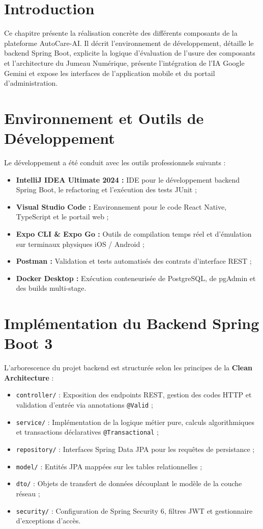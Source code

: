 \documentclass[12pt,a4paper,oneside]{report}
\newcommand{\bpuce}{\textcolor{midBlue}{$\blacktriangleright$}\;}
\newcommand{\subpuce}{\textcolor{steelBlue}{$\bullet$}\;}
\begin{document}
\section{Introduction}
Ce chapitre pr\'esente la r\'ealisation concr\`ete des diff\'erents composants de la plateforme AutoCare-AI. Il d\'ecrit l'environnement de d\'eveloppement, d\'etaille le backend Spring Boot, explicite la logique d'\'evaluation de l'usure des composants et l'architecture du Jumeau Num\'erique, pr\'esente l'int\'egration de l'IA Google Gemini et expose les interfaces de l'application mobile et du portail d'administration.

\section{Environnement et Outils de D\'eveloppement}
Le d\'eveloppement a \'et\'e conduit avec les outils professionnels suivants :
\begin{itemize}[label=\bpuce]
  \item \textbf{IntelliJ IDEA Ultimate 2024 :} IDE pour le d\'eveloppement backend Spring Boot, le refactoring et l'ex\'ecution des tests JUnit ;
  \item \textbf{Visual Studio Code :} Environnement pour le code React Native, TypeScript et le portail web ;
  \item \textbf{Expo CLI \& Expo Go :} Outils de compilation temps r\'eel et d'\'emulation sur terminaux physiques iOS / Android ;
  \item \textbf{Postman :} Validation et tests automatis\'es des contrats d'interface REST ;
  \item \textbf{Docker Desktop :} Ex\'ecution conteneuris\'ee de PostgreSQL, de pgAdmin et des builds multi-stage.
\end{itemize}

\section{Impl\'ementation du Backend Spring Boot 3}
L'arborescence du projet backend est structur\'ee selon les principes de la \textbf{Clean Architecture} :
\begin{itemize}[label=\subpuce]
  \item \texttt{controller/} : Exposition des endpoints REST, gestion des codes HTTP et validation d'entr\'ee via annotations \texttt{@Valid} ;
  \item \texttt{service/} : Impl\'ementation de la logique m\'etier pure, calculs algorithmiques et transactions d\'eclaratives \texttt{@Transactional} ;
  \item \texttt{repository/} : Interfaces Spring Data JPA pour les requ\^etes de persistance ;
  \item \texttt{model/} : Entit\'es JPA mapp\'ees sur les tables relationnelles ;
  \item \texttt{dto/} : Objets de transfert de donn\'ees d\'ecouplant le mod\`ele de la couche r\'eseau ;
  \item \texttt{security/} : Configuration de Spring Security 6, filtres JWT et gestionnaire d'exceptions d'acc\`es.
\end{itemize}
\end{document}
